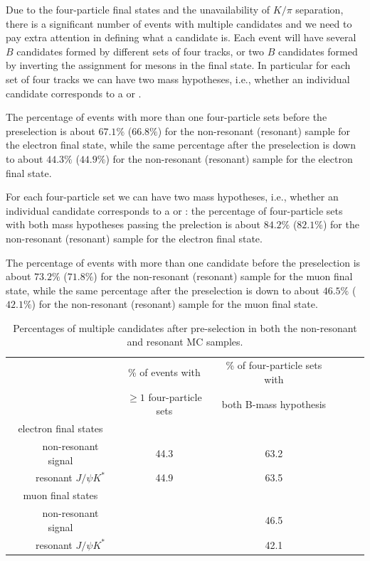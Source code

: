 Due to the four-particle final states and the unavailability of $K/\pi$ separation,
there is a significant number of events with multiple candidates and we need to
pay extra attention in defining what a candidate is.
Each event will have several $B$ candidates formed by different sets of four tracks,
or two $B$ candidates formed by inverting the assignment for mesons in the final state.
In particular for each set of four tracks we can have two mass hypotheses, i.e., whether
an individual candidate corresponds to a \Bd or \Bdb.

The percentage of events with more than one four-particle sets before the preselection is about $67.1\%$ ($66.8\%$)
for the non-resonant (resonant) sample for the electron final state,
while the same percentage after the preselection is down to about $44.3\%$ ($44.9\%$)
for the non-resonant (resonant) sample for the electron final state.

For each four-particle set we can have two mass hypotheses, i.e., whether
an individual candidate corresponds to a \Bd or \Bdb: the percentage of four-particle sets
with both mass hypotheses passing the prelection is about $84.2\%$ ($82.1\%$)
for the non-resonant (resonant) sample for the electron final state.




The percentage of events with more than one candidate before the preselection is about $73.2\%$ ($71.8\%$)
for the non-resonant (resonant) sample for the muon final state,
while the same percentage after the preselection is down to about $46.5\%$ ($42.1\%$)
for the non-resonant (resonant) sample for the muon final state.


\begin{table}[h]
\begin{center}
\begin{tabular}{cccccc}
\hline
            &  \% of events with           &  \% of four-particle sets with  \\
            &  $\geq 1$ four-particle sets &  both B-mass hypothesis \\
\hline\hline
electron final states   & & \\
\hline
~~~~non-resonant signal & 44.3 & 63.2\\
~~~~resonant $J/\psi K^*$ & 44.9 & 63.5\\
\hline\hline
muon final states       & & \\
\hline
~~~~non-resonant signal & & 46.5 \\
~~~~resonant $J/\psi K^*$ &  & 42.1 \\
\hline\hline
\end{tabular}
\end{center}
\caption{Percentages of multiple candidates after pre-selection in both the non-resonant and
resonant MC samples.}
\label{tab:multiplecandidates}
\end{table}


